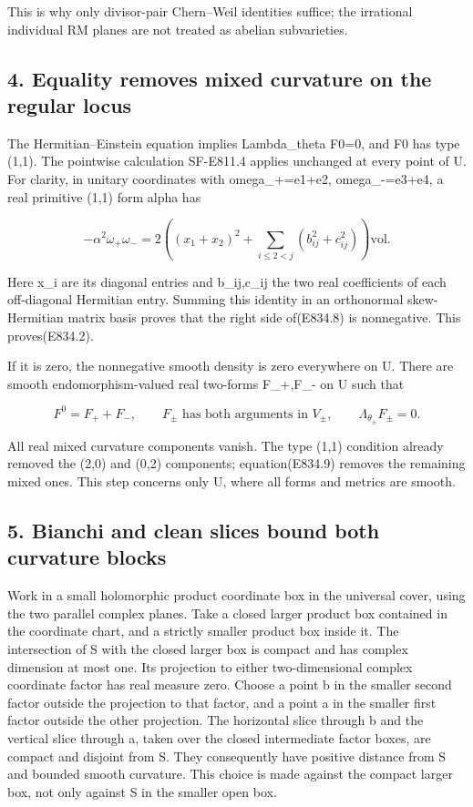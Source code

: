 This is why only divisor-pair Chern--Weil identities suffice; the
irrational individual RM planes are not treated as abelian subvarieties.

\subsection{4. Equality removes mixed curvature on the regular
locus}\label{SF-E834:equality-removes-mixed-curvature-on-the-regular-locus}

The Hermitian--Einstein equation implies Lambda\_theta F0=0, and F0 has
type (1,1). The pointwise calculation SF-E811.4 applies unchanged at
every point of U. For clarity, in unitary coordinates with
omega\_+=e1+e2, omega\_-=e3+e4, a real primitive (1,1) form alpha has

\[
 -\alpha^2\omega_+\omega_-
 =2\left((x_1+x_2)^2+
       \sum_{i\le2<j}(b_{ij}^2+c_{ij}^2)\right)\mathrm{vol}.
 \tag{E834.9}
\]

Here x\_i are its diagonal entries and b\_ij,c\_ij the two real
coefficients of each off-diagonal Hermitian entry. Summing this identity
in an orthonormal skew-Hermitian matrix basis proves that the right side
of(E834.8) is nonnegative. This proves(E834.2).

If it is zero, the nonnegative smooth density is zero everywhere on U.
There are smooth endomorphism-valued real two-forms F\_+,F\_- on U such
that

\[
 F^0=F_++F_-,\qquad
 F_\pm\text{ has both arguments in }V_\pm,\qquad
 \Lambda_{\theta_\pm}F_\pm=0.
 \tag{E834.10}
\]

All real mixed curvature components vanish. The type (1,1) condition
already removed the (2,0) and (0,2) components; equation(E834.9) removes
the remaining mixed ones. This step concerns only U, where all forms and
metrics are smooth.

\subsection{5. Bianchi and clean slices bound both curvature
blocks}\label{SF-E834:bianchi-and-clean-slices-bound-both-curvature-blocks}

Work in a small holomorphic product coordinate box in the universal
cover, using the two parallel complex planes. Take a closed larger
product box contained in the coordinate chart, and a strictly smaller
product box inside it. The intersection of S with the closed larger box
is compact and has complex dimension at most one. Its projection to
either two-dimensional complex coordinate factor has real measure zero.
Choose a point b in the smaller second factor outside the projection to
that factor, and a point a in the smaller first factor outside the other
projection. The horizontal slice through b and the vertical slice
through a, taken over the closed intermediate factor boxes, are compact
and disjoint from S. They consequently have positive distance from S and
bounded smooth curvature. This choice is made against the compact larger
box, not only against S in the smaller open box.


